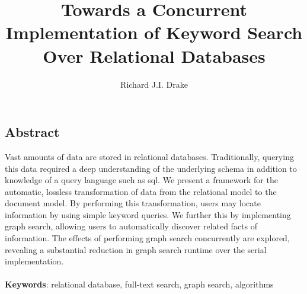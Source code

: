\documentclass[grad,openright]{uoit-thesis}
\author{Richard J.I. Drake}
\title{Towards a Concurrent Implementation of Keyword Search Over Relational Databases}
\begin{document}
	
	
	
	\begin{preliminary}
		\maketitle

		\setcounter{page}{3}
		
		\chapter*{Abstract}
			Vast amounts of data are stored in relational databases.  Traditionally, querying this data required a deep understanding of the underlying schema in addition to knowledge of a query language such as \gls{sql}.  We present a framework for the automatic, lossless transformation of data from the relational model to the document model.    By performing this transformation, users may locate information by using simple keyword queries.  We further this by implementing graph search, allowing users to automatically discover related facts of information.  The effects of performing graph search concurrently are explored, revealing a substantial reduction in graph search runtime over the serial implementation.
			\\ \\
			\textbf{Keywords}:  relational database, full-text search, graph search, algorithms

		\tableofcontents
		
		\listoftables
		
		\listoffigures
		
		\listofalgorithms
		
		\printglossaries
	\end{preliminary}
	
	
	
	
	
	
	
	
	
	
	
	

	\appendix
	
	\begin{singlespaced}
		
	\end{singlespaced}
	
	
	
	\printbibliography
\end{document}
